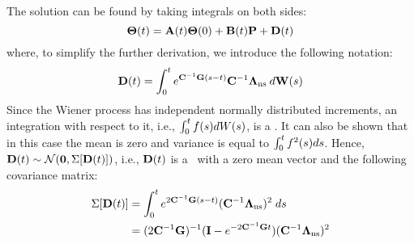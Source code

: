 The solution can be found by taking integrals on both sides:
\begin{equation} \equlabel{solution-full}
  \vtemp(\time) = \m{A}(\time) \vtemp(0) + \m{B}(\time) \vpower + \v{D}(\time)
\end{equation}
where, to simplify the further derivation, we introduce the following notation:
\begin{equation} \equlabel{d}
  \v{D}(\time) = \int_0^{\time} \ecg{}{(s - \time)} \mcapacitance^{-1} \ddev{\noisy} \: d\m{W}(s)
\end{equation}
Since the Wiener process has independent normally distributed increments, an integration with respect to it, i.e., $\int_0^t f(s) dW(s)$, is a \nrv. It can also be shown that in this case the mean is zero and variance is equal to $\int_0^t f^2(s) ds$. Hence, $\mathbf{D}(t) \sim \mathcal{N}(\mathbf{0}, \Sigma[\mathbf{D}(t)])$, i.e., $\mathbf{D}(t)$ is a \mnrv\ with a zero mean vector and the following covariance matrix:
\begin{align}
  \cov{\v{D}(\time)} & = \int_0^\time \ecg{2}{(s - \time)} (\mcapacitance^{-1} \ddev{\noisy})^2 \; ds \nonumber \\
  & = (2 \cg)^{-1} (\mone - \emcgt{2}) (\mcapacitance^{-1} \ddev{\noisy})^2 \equlabel{covariance-d}
\end{align}

